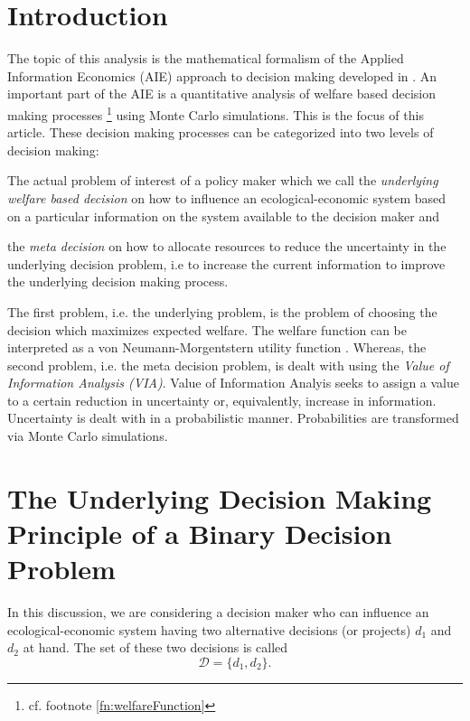 \documentclass[a4paper,10pt,twoside,pagesize,abstracton]{scrartcl}
\theoremstyle{plain}%
\theoremstyle{definition}
\theoremstyle{remark}
\begin{document}
\tableofcontents

\section{Introduction}
The topic of this analysis is the mathematical formalism of the Applied Information Economics (AIE) approach to decision making developed in \citet{Hubbard2014}. An important part of the AIE is a quantitative analysis of welfare based decision making processes%
\footnote{%
  cf. footnote \ref{fn:welfareFunction}
} using Monte Carlo simulations. This is the focus of this article. These decision making processes can be categorized into two levels of decision making:
\begin{compactenum}
  \item \label{enum:underlyingProblem} 
    The actual problem of interest of a policy maker which we call the \emph{underlying welfare based decision} on how to influence an ecological-economic system based on a particular information on the system available to the decision maker and 
  \item \label{enum:metaProblem}
    the \emph{meta decision} on how to allocate resources to reduce the uncertainty in the underlying decision problem, i.e to increase the current information to improve the underlying decision making process.
\end{compactenum}
The first problem, i.e. the underlying problem, is the problem of choosing the decision which maximizes expected welfare. The welfare function can be interpreted as a von Neumann-Morgentstern utility function \citep{GravelleRees2004}. Whereas, the second problem, i.e. the meta decision problem, is dealt with using the \emph{Value of Information Analysis (VIA)}. Value of Information Analyis seeks to assign a value to a certain reduction in uncertainty or, equivalently, increase in information. Uncertainty is dealt with in a probabilistic manner. Probabilities are transformed via Monte Carlo simulations.

\section{The Underlying Decision Making Principle of a Binary Decision Problem}
In this discussion, we are considering a decision maker who can influence an ecological-economic system having two alternative decisions (or projects) $d_1$ and $d_2$ at hand. The set of these two decisions is called
\begin{equation}
  \label{eq:underlyingDecisionProblem}
   \mathcal{D} = \{d_1, d_2\}.
\end{equation}
\end{document}
